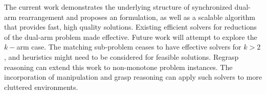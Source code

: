 The current work demonstrates the underlying structure of synchronized dual-arm rearrangement and proposes an \milp formulation, as well as a scalable algorithm \algo that provides fast, high quality solutions. Existing efficient solvers for reductions of the dual-arm problem made \algo effective. 
\cameraready
{
Future work will attempt to explore the $k-$arm case. The matching sub-problem ceases to have effective solvers for $k>2$, and heuristics might need to be considered for feasible solutions. Regrasp reasoning can extend this work to non-monotone problem instances. The incorporation of manipulation and grasp reasoning can apply such solvers to more cluttered environments.
}

